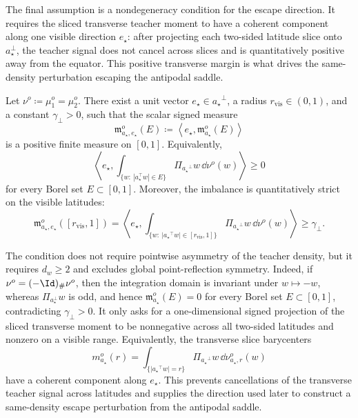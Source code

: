 The final assumption is a nondegeneracy condition for the escape direction.
It requires the sliced transverse teacher moment to have a coherent component
along one visible direction \(e_\star\): after projecting each two-sided latitude
slice onto \(a_\star^\perp\), the teacher signal does not cancel across slices
and is quantitatively positive away from the equator.  This positive transverse
margin is what drives the same-density perturbation escaping the antipodal
saddle.
\begin{assumption}
\label{assumption:quantitative-unweighted-two-sided-transverse-imbalance}
Let $\nu^o \coloneq \mu_1^o = \mu_2^o$.
There exist a unit vector \(e_\star\in {a_\star}^\perp\), a radius
\(r_{\mathrm{vis}}\in(0,1)\), and a constant \(\gamma_\perp>0\), such that
the scalar signed measure
\[
    \mathfrak m_{a_\star,e_\star}^o(E)
    \coloneq
    \left\langle e_\star,\mathfrak m_{a_\star}^o(E)\right\rangle
\]
is a positive finite measure on \([0,1]\).  Equivalently,
\[
    \left\langle
        e_\star,
        \int_{\{w:\ |a_\star^\top w|\in E\}}
        \Pi_{{a_\star}^\perp}w\,\dd\nu^o(w)
    \right\rangle
    \ge0
\]
for every Borel set \(E\subset[0,1]\).  Moreover, the imbalance is
quantitatively strict on the visible latitudes:
\[
    \mathfrak m_{{a_\star},e_\star}^o([r_{\mathrm{vis}},1])
    =
    \left\langle
        e_\star,
        \int_{\{w:\ |{a_\star}^\top w|\in [r_{\mathrm{vis}},1]\}}
        \Pi_{{a_\star}^\perp}w\,\dd\nu^o(w)
    \right\rangle
    \ge \gamma_\perp.
\]
\end{assumption}

\begin{remark}
The condition does not require pointwise asymmetry of the teacher density,
but it requires \(d_w\ge2\) and excludes global point-reflection symmetry.
Indeed, if \(\nu^o=(-\Id)_\#\nu^o\), then the integration domain is invariant
under \(w\mapsto-w\), whereas \(\Pi_{a_\star^\perp}w\) is odd, and hence
\(\mathfrak m_{a_\star}^o(E)=0\) for every Borel set \(E\subset[0,1]\),
contradicting \(\gamma_\perp>0\).
It only asks for a one-dimensional signed projection of the sliced transverse
moment to be nonnegative across all two-sided latitudes and nonzero on a visible
range.  Equivalently, the transverse slice barycenters
\[
    m_{a_\star}^o(r)
    =
    \int_{\{|{a_\star}^\top w|=r\}}
    \Pi_{{a_\star}^\perp}w\,\dd\nu_{{a_\star},r}^o(w)
\]
have a coherent component along \(e_\star\).  This prevents cancellations of
the transverse teacher signal across latitudes and supplies the direction used
later to construct a same-density escape perturbation from the antipodal saddle.
\end{remark}


